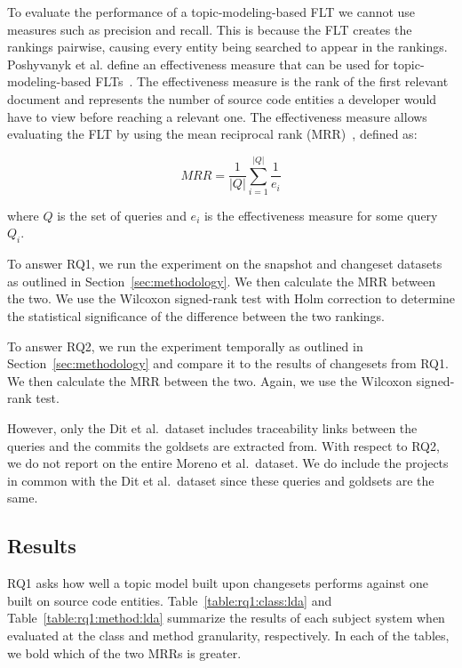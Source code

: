 To evaluate the performance of a topic-modeling-based FLT we cannot use
measures such as precision and recall. This is because the FLT creates
the rankings pairwise, causing every entity being searched to appear in the rankings.
Poshyvanyk et al. define an effectiveness measure that can be used for topic-modeling-based FLTs~\cite{Poshyvanyk-etal:2007}.
The effectiveness measure is the rank of the first relevant document
and represents the number of source code entities a developer would have to view before reaching a relevant one.
The effectiveness measure allows evaluating the FLT by using
the mean reciprocal rank (MRR)~\cite{Voorhees:1999}, defined as:

\begin{equation}
    MRR = \frac{1}{|Q|} \sum_{i=1}^{|Q|} \frac{1}{e_i}
\end{equation}

where $Q$ is the set of queries
and $e_i$ is the effectiveness measure for some query $Q_i$.

To answer RQ1, we run the experiment on the snapshot and changeset
datasets as outlined in Section~\ref{sec:methodology}.
We then calculate the MRR between the two.
We use the Wilcoxon signed-rank test with Holm correction to determine
the statistical significance of the difference between the two rankings.

To answer RQ2, we run the experiment temporally as outlined in Section~\ref{sec:methodology}
and compare it to the results of changesets from RQ1.
We then calculate the MRR between the two.
Again, we use the Wilcoxon signed-rank test.

However, only the Dit et al.\ dataset includes traceability links between
the queries and the commits the goldsets are extracted from.
With respect to RQ2, we do not report on the entire Moreno et al.\ dataset.
We do include the projects in common with the Dit et al.\ dataset
since these queries and goldsets are the same.



\subsection{Results}




RQ1 asks how well a topic model built upon changesets performs against
one built on source code entities.
Table~\ref{table:rq1:class:lda} and Table~\ref{table:rq1:method:lda}
summarize the results of each subject system when
evaluated at the class and method granularity, respectively.
In each of the tables, we bold which of the two MRRs is greater.

